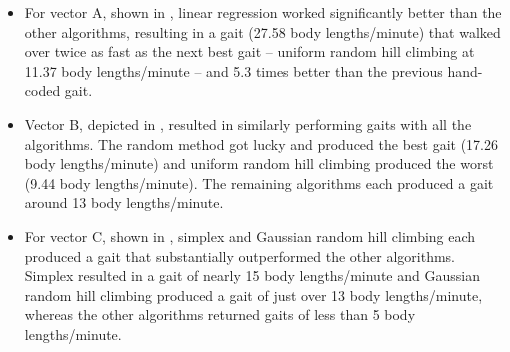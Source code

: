 \begin{itemize}

\item For vector A, shown in , linear regression
  worked significantly better than the other algorithms, resulting in
  a gait (27.58 body lengths/minute) that walked over twice as fast as
  the next best gait -- uniform random hill climbing at 11.37 body
  lengths/minute -- and 5.3 times better than the previous hand-coded
  gait.

\item Vector B, depicted in , resulted in similarly
  performing gaits with all the algorithms. The random method got
  lucky and produced the best gait (17.26 body lengths/minute) and
  uniform random hill climbing produced the worst (9.44 body
  lengths/minute). The remaining algorithms each produced a gait
  around 13 body lengths/minute.

\item For vector C, shown in , simplex and Gaussian
  random hill climbing each produced a gait that substantially
  outperformed the other algorithms. Simplex resulted in a gait of
  nearly 15 body lengths/minute and Gaussian random hill climbing
  produced a gait of just over 13 body lengths/minute, whereas the
  other algorithms returned gaits of less than 5 body lengths/minute.

\end{itemize}

%
%



